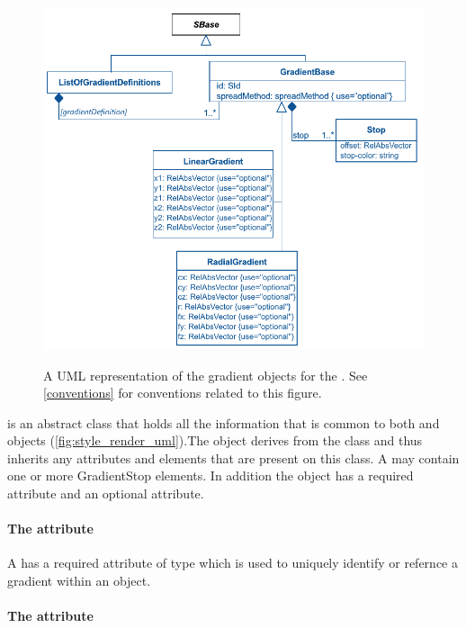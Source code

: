 \begin{figure}[h!]
  \centering
  \includegraphics{images/render-gradient-definitions-uml}\\
  \caption{A UML representation of the gradient objects for the \RenderPackage.  See \ref{conventions} for conventions related to this figure. }
  \label{fig:gradient_render_uml}
\end{figure}


\GradientBase is an abstract class that holds all the information that is common to both \RadialGradient and \LinearGradient objects (\ref{fig:style_render_uml}).The \GradientBase object derives from the \SBase class and thus inherits
any attributes and elements that are present on this class.
A \GradientBase may contain one or more GradientStop elements.
In addition the \GradientBase object has a required  attribute and an optional  attribute.

\paragraph{The \fixttspace{} attribute}

A \GradientBase has a required attribute  of type
 which is used to uniquely identify or refernce a gradient within an \RenderInformation object.

\paragraph{The \fixttspace{} attribute}

